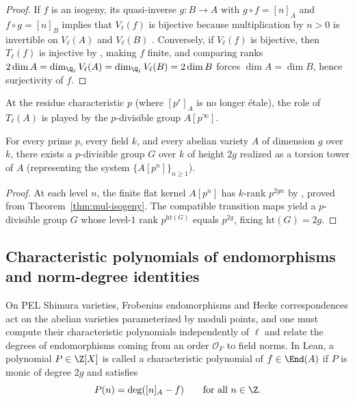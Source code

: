 \begin{proof}
If $f$ is an isogeny, its quasi-inverse $g : B \to A$ with $g \circ f = [n]_A$
and $f \circ g = [n]_B$ implies that $V_\ell(f)$ is bijective because
multiplication by $n > 0$ is invertible on $V_\ell(A)$ and $V_\ell(B)$
.
Conversely, if $V_\ell(f)$ is bijective, then $T_\ell(f)$ is injective by
,
making $f$ finite, and comparing ranks $2 \dim A = \dim_{\Q_\ell} V_\ell(A) =
\dim_{\Q_\ell} V_\ell(B) = 2 \dim B$ forces $\dim A = \dim B$, hence
surjectivity of $f$.
\end{proof}

At the residue characteristic $p$ (where $[p^r]_A$ is no longer étale), the
role of $T_\ell(A)$ is played by the $p$-divisible group $A[p^\infty]$.

\begin{proposition}
\label{prop:pdiv-tower}
For every prime $p$, every field $k$, and every abelian variety $A$ of
dimension $g$ over $k$, there exists a $p$-divisible group $G$ over $k$ of
height $2g$ realized as a torsion tower of $A$ (representing the system
$\{A[p^n]\}_{n \ge 1}$).
\end{proposition}

\begin{proof}
At each level $n$, the finite flat kernel $A[p^n]$ has $k$-rank $p^{2gn}$ by
, proved from
Theorem~\ref{thm:mul-isogeny}. The compatible transition maps yield a
$p$-divisible group $G$ whose level-$1$ rank $p^{\mathrm{ht}(G)}$ equals
$p^{2g}$, fixing $\mathrm{ht}(G) = 2g$.
\end{proof}

\subsection{Characteristic polynomials of endomorphisms and norm-degree identities}

On PEL Shimura varieties, Frobenius endomorphisms and Hecke correspondences
act on the abelian varieties parameterized by moduli points, and one must
compute their characteristic polynomials independently of $\ell$ and relate the
degrees of endomorphisms coming from an order $\mathcal{O}_F$ to field norms.
In Lean, a polynomial $P \in \Z[X]$ is called a characteristic polynomial of
$f \in \End(A)$  if $P$ is monic of
degree $2g$ and satisfies
\[
  P(n) = \deg([n]_A - f) \qquad \text{for all } n \in \Z.
\]

